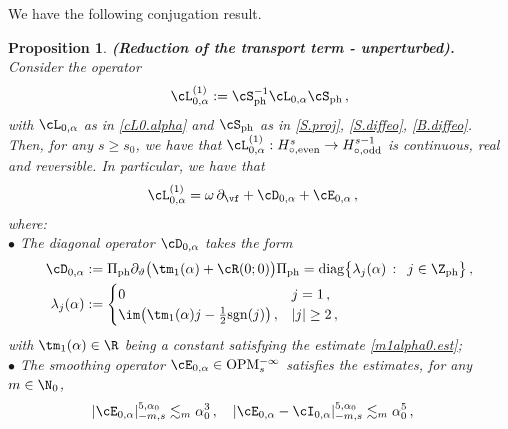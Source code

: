 \documentclass[a4paper,reqno,10pt]{article}
\newtheorem{pro}{Proposition}[section]
\newcommand{\pa}{\partial}
\newcommand{\OpM}{{\rm O}{\rm P}{\rm M}}
\begin{document}
We have the following conjugation result.
\begin{pro}\label{diffeo.conj.no.proj}
	{\bf (Reduction of the transport term - unperturbed).}
	Consider the operator
	$$
	\cL_{0,\alpha}^{(1)}  := 	\cS_{\rm ph}^{-1} \cL_{0,\alpha} \cS_{\rm ph} \,,
	$$
    with $\cL_{0,\alpha}$ as in \eqref{cL0.alpha} and $\cS_{\rm ph}$ as in \eqref{S.proj}, \eqref{S.diffeo}, \eqref{B.diffeo}.
	Then, for any $s\geqslant s_0$, we have that  $\cL_{0,\alpha}^{(1)}:H_{\circ,{\rm even}}^s\to H_{\circ,{\rm odd}}^{s-1}$ is  continuous, real and reversible. In particular, we have that 	
	\begin{align}
			\cL_{0,\alpha}^{(1)}  %
			&= \omega\,\pa_{\vf} + \cD_{0,\alpha}+ \cE_{0,\alpha} \,,\label{conj.no.proj}
	\end{align}
	where:
    \\[1mm]
    \noindent $\bullet$ The diagonal operator $\cD_{0,\alpha}$ takes the form
	\begin{equation}\label{diag.0.alpha}
		\begin{aligned}
			\cD_{0,\alpha}& :=  \Pi_{\rm ph}\pa_{\vartheta} \big( \tm_{1}(\alpha) + \cR(0;0) \big)\Pi_{\rm ph} =  {\rm diag}\big\{ \lambda_{j}(\alpha) \,: \,\ j \in \Z_{\rm ph} \big\} \,,  \\
			\lambda_{j}(\alpha) & := \begin{cases}
            0 & j=1\,, \\
			    \im \big(  \tm_{1}(\alpha) j - \tfrac{1}{2} {\rm sgn}(j) \big)\,, &  |j|\geq 2 \,,
			\end{cases} 
		\end{aligned}
	\end{equation}
	with   $\tm_{1}(\alpha)\in\R$ being a constant  satisfying the estimate \eqref{m1alpha0.est};
	\\[1mm]
    \noindent $\bullet$ The  smoothing operator $\cE_{0,\alpha}\in\OpM_{s}^{-\infty}$
	satisfies the estimates, for any $m\in \N_{0}$,
	\begin{equation}\label{cE.0.alpha.est}
		\begin{aligned}
			&	|  \cE_{0,\alpha}  |_{-m,s}^{5,\alpha_{0}} \lesssim_{m} \alpha_{0}^3  \,,  \quad	| \cE_{0,\alpha}-  \cI_{0,\alpha}  |_{-m,s}^{5,\alpha_{0}} \lesssim_{m} \alpha_{0}^5  \,,

\end{aligned}
\end{equation}
\end{pro}
\end{document}
